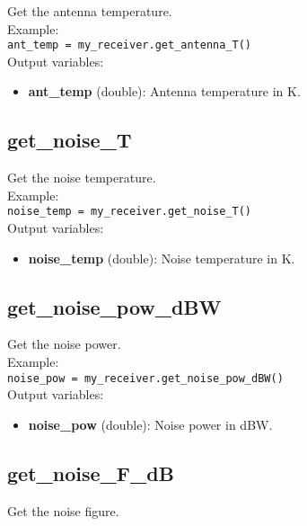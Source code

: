 Get the antenna temperature.\\

Example:\\

\texttt{ant\_temp = my\_receiver.get\_antenna\_T()}\\

Output variables:
\begin{itemize}
\item {\bf ant\_temp} (double): Antenna temperature in K.
\end{itemize}


\subsection{get\_noise\_T}

Get the noise temperature.\\

Example:\\

\texttt{noise\_temp = my\_receiver.get\_noise\_T()}\\

Output variables:
\begin{itemize}
\item {\bf noise\_temp} (double): Noise temperature in K.
\end{itemize}


\subsection{get\_noise\_pow\_dBW}

Get the noise power.\\

Example:\\

\texttt{noise\_pow = my\_receiver.get\_noise\_pow\_dBW()}\\

Output variables:
\begin{itemize}
\item {\bf noise\_pow} (double): Noise power in dBW.
\end{itemize}


\subsection{get\_noise\_F\_dB}

Get the noise figure.\\

